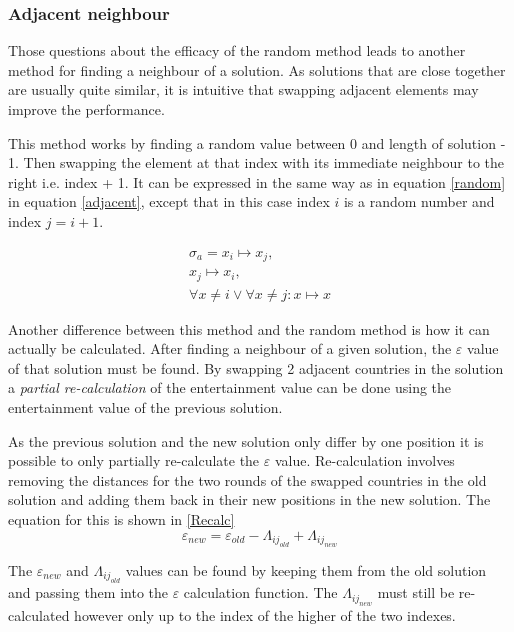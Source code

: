 \documentclass[12pt]{report}
\begin{document}
\subsubsection{Adjacent neighbour}
Those questions about the efficacy of the random method leads to another method for finding a neighbour of a solution. As solutions that are close together are usually quite similar, it is intuitive that swapping adjacent elements may improve the performance.

This method works by finding a random value between 0 and length of solution - 1. Then swapping the element at that index with its immediate neighbour to the right i.e. index + 1. It can be expressed in the same way as in equation \ref{random} in equation \ref{adjacent}, except that in this case index $i$ is a random number and index $j = i + 1$.

\begin{equation}\label{adjacent}
\begin{split}
	\sigma_a = x_i \mapsto x_j,\\ x_j \mapsto x_i,\\ \forall x \neq i \lor \forall x \neq j: x \mapsto x
\end{split}
\end{equation}

Another difference between this method and the random method is how it can actually be calculated. After finding a neighbour of a given solution, the $\varepsilon$ value of that solution must be found. By swapping 2 adjacent countries in the solution a \textit{partial re-calculation} of the entertainment value can be done using the entertainment value of the previous solution. 

As the previous solution and the new solution only differ by one position it is possible to only partially re-calculate the $\varepsilon$ value. Re-calculation involves removing the distances for the two rounds of the swapped countries in the old solution and adding them back in their new positions in the new solution. The equation for this is shown in \ref{Recalc}
\begin{equation}\label{Recalc}
	\varepsilon_{new} = \varepsilon_{old} - \Lambda_{ij_{old}} + \Lambda_{ij_{new}}
\end{equation}

The $\varepsilon_{new}$ and $\Lambda_{ij_{old}}$ values can be found by keeping them from the old solution and passing them into the $\varepsilon$ calculation function. The $\Lambda_{ij_{new}}$ must still be re-calculated however only up to the index of the higher of the two indexes.
\end{document}
